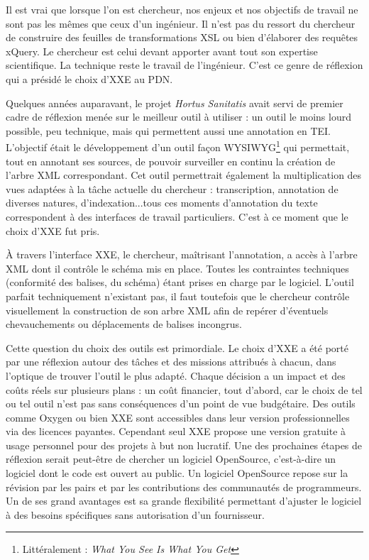 \documentclass[a4paper,12pt,twoside]{book}
\begin{document}
    Il est vrai que lorsque l'on est chercheur, nos enjeux et nos objectifs de travail ne sont pas les mêmes que ceux d'un ingénieur. Il n'est pas du ressort du chercheur de construire des feuilles de transformations \acrshort{XSL} ou bien d'élaborer des requêtes xQuery. Le chercheur est celui devant apporter avant tout son expertise scientifique. La technique reste le travail de l'ingénieur. C'est ce genre de réflexion qui a présidé le choix d'\acrshort{XXE} au \acrshort{PDN}.
    
    Quelques années auparavant, le projet \textit{Hortus Sanitatis} avait servi de premier cadre de réflexion menée sur le meilleur outil à utiliser : un outil le moins lourd possible, peu technique, mais qui permettent aussi une annotation en TEI. L'objectif était le développement d'un outil façon WYSIWYG\footnote{Littéralement : \textit{What You See Is What You Get}} qui permettait, tout en annotant ses sources, de pouvoir surveiller en continu la création de l'arbre XML correspondant. Cet outil permettrait également la multiplication des vues adaptées à la tâche actuelle du chercheur : transcription, annotation de diverses natures, d'indexation...tous ces moments d'annotation du texte correspondent à des interfaces de travail particuliers. C'est à ce moment que le choix d'\acrshort{XXE} fut pris.
    
    À travers l'interface XXE, le chercheur, maîtrisant l'annotation, a accès à l'arbre \acrshort{XML} dont il contrôle le schéma mis en place. Toutes les contraintes techniques (conformité des balises, du schéma) étant prises en charge par le logiciel. L'outil parfait techniquement n'existant pas, il faut toutefois que le chercheur contrôle visuellement la construction de son arbre XML afin de repérer d'éventuels chevauchements ou déplacements de balises incongrus.
    
    Cette question du choix des outils est primordiale. Le choix d'XXE a été porté par une réflexion autour des tâches et des missions attribués à chacun, dans l'optique de trouver l'outil le plus adapté. Chaque décision a un impact et des coûts réels sur plusieurs plans : un coût financier, tout d'abord, car le choix de tel ou tel outil n'est pas sans conséquences d'un point de vue budgétaire. Des outils comme Oxygen ou bien XXE sont accessibles dans leur version professionnelles via des licences payantes. Cependant seul XXE propose une version gratuite à usage personnel pour des projets à but non lucratif. Une des prochaines étapes de réflexion serait peut-être de chercher un logiciel OpenSource, c'est-à-dire un logiciel dont le code est ouvert au public. Un logiciel OpenSource repose sur la révision par les pairs et par les contributions des communautés de programmeurs. Un de ses grand avantages est sa grande flexibilité permettant d'ajuster le logiciel à des besoins spécifiques sans autorisation d'un fournisseur.
    
\end{document}
